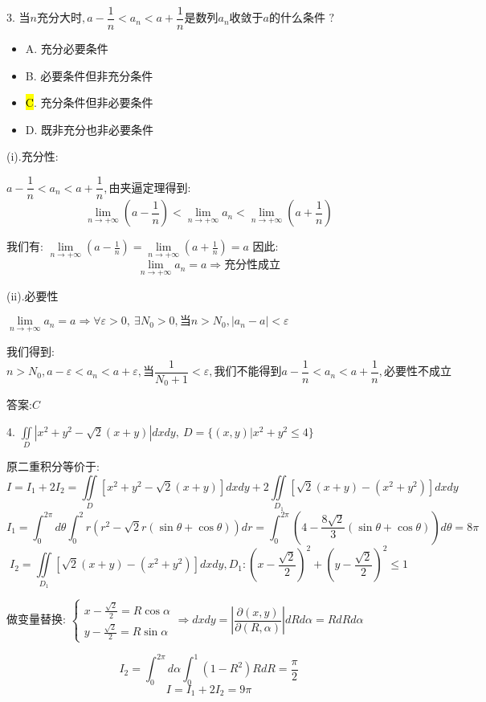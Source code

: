 
3. $\text{当}n\text{充分大时},a-\dfrac{1}{n}<a_{n}<a+\dfrac{1}{n}\text{是数列}a_{n}\text{收敛于}a\text{的什么条件 ?}$
\begin{itemize}
	\item A. $\text{充分必要条件}$
	\item B. $\text{必要条件但非充分条件}$
	\item \hl{C}. $\text{充分条件但非必要条件}$
	\item D. $\text{既非充分也非必要条件}$
\end{itemize}
\begin{solution}
	
	(i).充分性: 
	
	$a-\dfrac{1}{n}<a_{n}<a+\dfrac{1}{n},\text{由夹逼定理得到: }$
	$$\lim\limits_{n\rightarrow +\infty}(a-\frac{1}{n})<\lim\limits_{n\rightarrow +\infty}a_{n}<\lim\limits_{n\rightarrow +\infty}(a+\frac{1}{n})$$
	
	我们有: $\lim\limits_{n\rightarrow +\infty}(a-\frac{1}{n})=\lim\limits_{n\rightarrow +\infty}(a+\frac{1}{n})=a$
	因此: 
	$$\lim\limits_{n\rightarrow +\infty}a_{n}=a\Rightarrow\text{充分性成立}$$
	
	(ii).必要性
	
	$\lim\limits_{n\rightarrow +\infty}a_{n}=a\Rightarrow \forall \varepsilon>0,\ \exists N_{0}>0,\text{当}n>N_{0},|a_{n}-a|<\varepsilon$
	
	我们得到: 
	$$n>N_{0},a-\varepsilon<a_{n}<a+\varepsilon,\text{当}\frac{1}{N_{0}+1}<\varepsilon,\text{我们不能得到}a-\frac{1}{n}<a_{n}<a+\frac{1}{n},\text{必要性不成立}$$
	
	答案:$C$
\end{solution}


4. $\iint\limits_{D}|x^2+y^2-\sqrt{2}(x+y)|dxdy,\ D=\{(x,y)|x^2+y^2\leq 4\}$
\begin{solution}
	
	原二重积分等价于: 
	$$I=I_{1}+2I_{2}=\iint\limits_{D}[x^2+y^2-\sqrt{2}(x+y)]dxdy+2\iint\limits_{D_{1}}[\sqrt{2}(x+y)-(x^2+y^2)]dxdy$$
	$$I_{1}=\int_{0}^{2\pi}d\theta\int_{0}^{2}r(r^2-\sqrt{2}r(\sin \theta+\cos \theta))dr=\int_{0}^{2\pi}(4-\frac{8\sqrt{2}}{3}(\sin\theta+\cos\theta))d\theta=8\pi$$
	$$I_{2}=\iint\limits_{D_{1}}[\sqrt{2}(x+y)-(x^2+y^2)]dxdy,D_{1}: (x-\frac{\sqrt{2}}{2})^2+(y-\frac{\sqrt{2}}{2})^2\leq 1$$
	
	做变量替换: $\left\lbrace 
	\begin{array}{l}
		x-\frac{\sqrt{2}}{2}=R\cos \alpha\\
		y-\frac{\sqrt{2}}{2}=R\sin \alpha
	\end{array}
	\right. \Rightarrow dxdy=\left| \dfrac{\partial (x,y)}{\partial (R,\alpha)}\right| dRd\alpha=RdRd\alpha$
	
	$$I_{2}=\int_{0}^{2\pi}d\alpha\int_{0}^{1} (1-R^2)RdR=\frac{\pi}{2}$$
	$$I=I_{1}+2I_{2}=9\pi$$
\end{solution}

